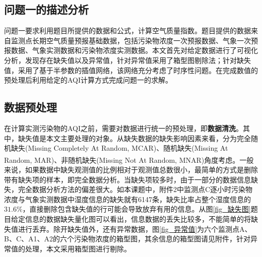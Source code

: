 \documentclass[a4paper,10pt]{my_paper}
\numberwithin{equation}{section}
\begin{document}
\subsection{问题一的描述分析}
问题一要求利用题目所提供的数据和公式，计算空气质量指数。题目提供的数据来自监测点长期空气质量预报基础数据，包括污染物浓度一次预报数据、气象一次预报数据、气象实测数据和污染物浓度实测数据。本文首先对给定数据进行了可视化分析，发现存在缺失值以及异常值，针对异常值采用了箱型图剔除法；针对缺失值，采用了基于半参数的插值网络，该网络充分考虑了时序性问题。在完成数值的预处理后利用给定的AQI计算方式完成问题一的求解。

\subsection{数据预处理}
在计算实测污染物的AQI之前，需要对数据进行统一的预处理，即\textbf{数据清洗}。其中，缺失值是本文主要处理的对象。从缺失数据的缺失影响因素来看，分为完全随机缺失(Missing Completely At Random, MCAR)、随机缺失(Missing At Random, MAR)、非随机缺失(Missing Not At Random, MNAR)角度考虑\textsuperscript{\cite{ref2}}。一般来说，如果数据中缺失观测值的比例相对于观测值总数很小，最简单的方式是删除带有缺失项的样本，即完全数据分析。当缺失项较多时，由于一部分的数据信息缺失，完全数据分析方法的偏差很大。如本课题中，附件2中监测点C逐小时污染物浓度与气象实测数据中湿度信息的缺失就有6147条，缺失比率占整个湿度信息的${31.6\%}$，直接删除包含缺失值的行可能会导致放弃有用的信息。从图\ref{fig_缺失图}题目给定信息的数据缺失量化图可以看出，信息数据的丢失比较多，不能简单的将缺失值进行丢弃。除开缺失值外，还有异常数据，图\ref{fig_异常值}为六个监测点A、B、C、A1、A2的六个污染物浓度的箱型图，其余信息的箱型图请见附件，针对异常值的处理，本文采用箱型图进行剔除。
\end{document}
